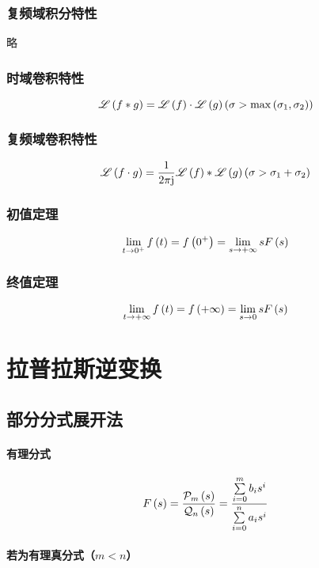 \documentclass{article}
\begin{document}
\subsubsection{复频域积分特性}

略

\subsubsection{时域卷积特性}

\[\mathscr L\left(f\ast g\right)=\mathscr L\left(f\right)\cdot\mathscr L\left(g\right)
    \left(\sigma>\max\left(\sigma_1,\sigma_2\right)\right)\]

\subsubsection{复频域卷积特性}

\[\mathscr L\left(f\cdot g\right)=
    \frac1{2\pi\mathrm j}\mathscr L\left(f\right)\ast\mathscr L\left(g\right)
    \left(\sigma>\sigma_1+\sigma_2\right)\]

\subsubsection{初值定理}

\[\lim_{t\to0^+}f\left(t\right)=f\left(0^+\right)=\lim_{s\to+\infty}sF\left(s\right)\]

\subsubsection{终值定理}

\[\lim_{t\to+\infty}f\left(t\right)=f\left(+\infty\right)=\lim_{s\to0}sF\left(s\right)\]

\section{拉普拉斯逆变换}

\subsection{部分分式展开法\label{拉普拉斯变换部分分式展开法}}

\paragraph{有理分式}

\[F\left(s\right)=\frac{\mathcal P_m\left(s\right)}{\mathcal Q_n\left(s\right)}
    =\frac{\sum\limits_{i=0}^mb_is^i}{\sum\limits_{i=0}^na_is^i}\]

\paragraph{若为有理真分式（$m<n$）}
\end{document}
